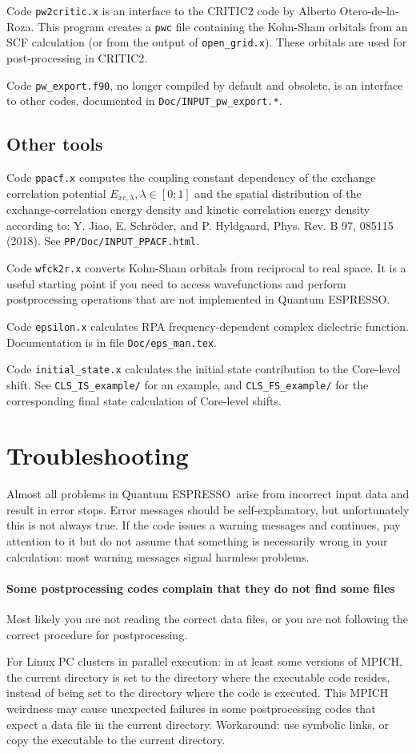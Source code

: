 \documentclass[12pt,a4paper]{article}
\def\qe{{\sc Quantum ESPRESSO}}
\begin{document}
Code \texttt{pw2critic.x} is an interface to the CRITIC2 code by
Alberto Otero-de-la-Roza. This program creates a \texttt{pwc} file
containing the Kohn-Sham orbitals from an SCF calculation (or from the
output of \texttt{open\_grid.x}). These orbitals are used for
post-processing in CRITIC2.

Code \texttt{pw\_export.f90}, no longer compiled by default and obsolete,
is an interface to other codes, documented in \texttt{Doc/INPUT\_pw\_export.*}.

\subsection{Other tools}

Code \texttt{ppacf.x} computes the coupling constant dependency of the
exchange correlation potential $E_{xc,\lambda}, \lambda \in [0:1]$
and the spatial distribution of the exchange-correlation energy density
and kinetic correlation energy density according to:
Y. Jiao, E. Schr\"oder, and P. Hyldgaard, Phys. Rev. B 97, 085115 (2018).
See \texttt{PP/Doc/INPUT\_PPACF.html}.

Code \texttt{wfck2r.x} converts Kohn-Sham orbitals from reciprocal to real 
space. It is a useful starting point if you need to access wavefunctions
and perform postprocessing operations that are not implemented in \qe.

Code \texttt{epsilon.x} calculates RPA frequency-dependent complex dielectric 
function. Documentation is in file \texttt{Doc/eps\_man.tex}.

Code \texttt{initial\_state.x} calculates the initial state contribution
to the Core-level shift. See \texttt{CLS\_IS\_example/} for
an example, and \texttt{CLS\_FS\_example/} for the corresponding
final state calculation of Core-level shifts.

\section{Troubleshooting}

Almost all problems in \qe\ arise from incorrect input data and result in
error stops. Error messages should be self-explanatory, but unfortunately
this is not always true. If the code issues a warning messages and continues,
pay attention to it but do not assume that something is necessarily wrong in
your calculation: most warning messages signal harmless problems.

\paragraph{Some postprocessing codes complain that they do not find some files}
Most likely you are not reading the correct data files, or you are not
following the correct procedure for postprocessing.

For Linux PC clusters in parallel execution: in at least some versions
of MPICH, the current directory is set to the directory where the executable
code resides, instead of being set to the directory where the code is executed.
This MPICH weirdness may cause unexpected failures in some postprocessing
codes that expect a data file in the current directory. Workaround: use
symbolic links, or copy the executable to the current directory.
\end{document}
